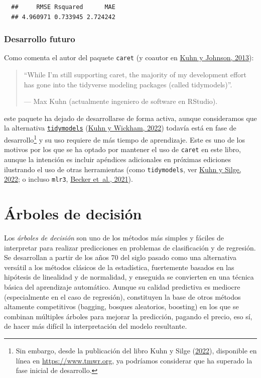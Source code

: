 \documentclass[
]{book}
\theoremstyle{break}
\theoremstyle{nonumberplain}
\begin{document}
\begin{verbatim}
  ##     RMSE Rsquared      MAE 
  ## 4.960971 0.733945 2.724242
\end{verbatim}

\hypertarget{desarrollo-futuro}{%
\subsection{Desarrollo futuro}\label{desarrollo-futuro}}

Como comenta el autor del paquete \texttt{caret} (y coautor en \protect\hyperlink{ref-kuhn2013applied}{Kuhn y Johnson, 2013}):

\begin{quote}
``While I'm still supporting caret, the majority of my development effort has gone into the tidyverse modeling packages (called tidymodels)''.

--- Max Kuhn (actualmente ingeniero de software en RStudio).
\end{quote}

este paquete ha dejado de desarrollarse de forma activa, aunque consideramos que la alternativa \href{https://www.tidymodels.org}{\texttt{tidymodels}} (\protect\hyperlink{ref-R-tidymodels}{Kuhn y Wickham, 2022}) todavía está en fase de desarrollo\footnote{Sin embargo, desde la publicación del libro Kuhn y Silge (\protect\hyperlink{ref-kuhn2022tidy}{2022}), disponible en línea en \url{https://www.tmwr.org}, ya podríamos considerar que ha superado la fase inicial de desarrollo.} y su uso requiere de más tiempo de aprendizaje.
Este es uno de los motivos por los que se ha optado por mantener el uso de \texttt{caret} en este libro, aunque la intención es incluir apéndices adicionales en próximas ediciones ilustrando el uso de otras herramientas (como \texttt{tidymodels}, ver \protect\hyperlink{ref-kuhn2022tidy}{Kuhn y Silge, 2022}; o incluso \texttt{mlr3}, \protect\hyperlink{ref-becker2021mlr3}{Becker et~al., 2021}).

\hypertarget{trees}{%
\chapter{Árboles de decisión}\label{trees}}

Los \emph{árboles de decisión} son uno de los métodos más simples y fáciles de interpretar para realizar predicciones en problemas de clasificación y de regresión.
Se desarrollan a partir de los años 70 del siglo pasado como una alternativa versátil a los métodos clásicos de la estadística, fuertemente basados en las hipótesis de linealidad y de normalidad, y enseguida se convierten en una técnica básica del aprendizaje automático.
Aunque su calidad predictiva es mediocre (especialmente en el caso de regresión), constituyen la base de otros métodos altamente competitivos (bagging, bosques aleatorios, boosting) en los que se combinan múltiples árboles para mejorar la predicción, pagando el precio, eso sí, de hacer más difícil la interpretación del modelo resultante.
\end{document}
